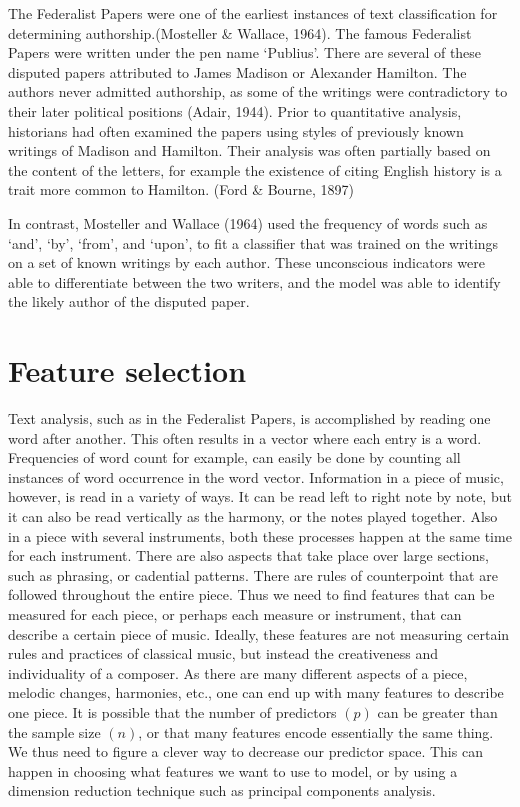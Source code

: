 \documentclass[12pt,twoside]{reedthesis}
\theoremstyle{definition}
\theoremstyle{definition}
\theoremstyle{definition}
\theoremstyle{remark}
\begin{document}
The Federalist Papers were one of the earliest instances of text
classification for determining authorship.(Mosteller \& Wallace, 1964).
The famous Federalist Papers were written under the pen name `Publius'.
There are several of these disputed papers attributed to James Madison
or Alexander Hamilton. The authors never admitted authorship, as some of
the writings were contradictory to their later political positions
(Adair, 1944). Prior to quantitative analysis, historians had often
examined the papers using styles of previously known writings of Madison
and Hamilton. Their analysis was often partially based on the content of
the letters, for example the existence of citing English history is a
trait more common to Hamilton. (Ford \& Bourne, 1897)

In contrast, Mosteller and Wallace (1964) used the frequency of words
such as `and', `by', `from', and `upon', to fit a classifier that was
trained on the writings on a set of known writings by each author. These
unconscious indicators were able to differentiate between the two
writers, and the model was able to identify the likely author of the
disputed paper.

\section{Feature selection}\label{feature-selection}

Text analysis, such as in the Federalist Papers, is accomplished by
reading one word after another. This often results in a vector where
each entry is a word. Frequencies of word count for example, can easily
be done by counting all instances of word occurrence in the word vector.
Information in a piece of music, however, is read in a variety of ways.
It can be read left to right note by note, but it can also be read
vertically as the harmony, or the notes played together. Also in a piece
with several instruments, both these processes happen at the same time
for each instrument. There are also aspects that take place over large
sections, such as phrasing, or cadential patterns. There are rules of
counterpoint that are followed throughout the entire piece. Thus we need
to find features that can be measured for each piece, or perhaps each
measure or instrument, that can describe a certain piece of music.
Ideally, these features are not measuring certain rules and practices of
classical music, but instead the creativeness and individuality of a
composer. As there are many different aspects of a piece, melodic
changes, harmonies, etc., one can end up with many features to describe
one piece. It is possible that the number of predictors \((p)\) can be
greater than the sample size \((n)\), or that many features encode
essentially the same thing. We thus need to figure a clever way to
decrease our predictor space. This can happen in choosing what features
we want to use to model, or by using a dimension reduction technique
such as principal components analysis.
\end{document}
